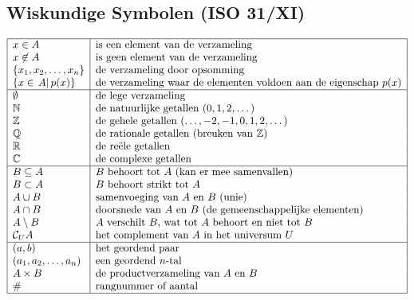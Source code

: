 \documentclass[a5paper]{article}
\begin{document}
\subsection{Wiskundige Symbolen (ISO 31/XI)}
$
\begin{array}{|l|l|}
\hline
x \in A & \text{is een element van de verzameling} \\
x \not\in A & \text{is geen element van de verzameling} \\
\{x_1, x_2, \dots, x_n\} & \text{de verzameling door opsomming} \\
\{ x \in \left. A \right|p(x)\} & \text{de verzameling waar de elementen voldoen aan de eigenschap } p(x) \\
\hline
\emptyset & \text{de lege verzameling} \\
\mathbb{N} & \text{de natuurlijke getallen } (0,1,2,\dots) \\
\mathbb{Z} & \text{de gehele getallen } (\dots, -2,-1,0,1,2,\dots) \\
\mathbb{Q} & \text{de rationale getallen (breuken van } \mathbb{Z} \text{)} \\
\mathbb{R} & \text{de reële getallen} \\
\mathbb{C} & \text{de complexe getallen} \\
\hline
B \subseteq A & B \text{ behoort tot } A \text{ (kan er mee samenvallen)} \\
B \subset A & B \text{ behoort strikt tot } A \\
A \cup B & \text{samenvoeging van } A \text{ en } B \text{ (unie)} \\
A \cap B & \text{doorsnede van } A \text{ en } B \text{ (de gemeenschappelijke elementen)} \\
A \setminus B & A \text{ verschilt } B \text{, wat tot } A \text{ behoort en niet tot } B \\
\mathcal{C}_U A & \text{het complement van } A \text{ in het universum } U \\
\hline
(a,b) & \text{het geordend paar} \\
(a_1, a_2, \dots, a_n) & \text{een geordend } n \text{-tal} \\
A \times B & \text{de productverzameling van } A \text{ en } B \\
\# & \text{rangnummer of aantal} \\
\hline
\end{array}
$
\end{document}

